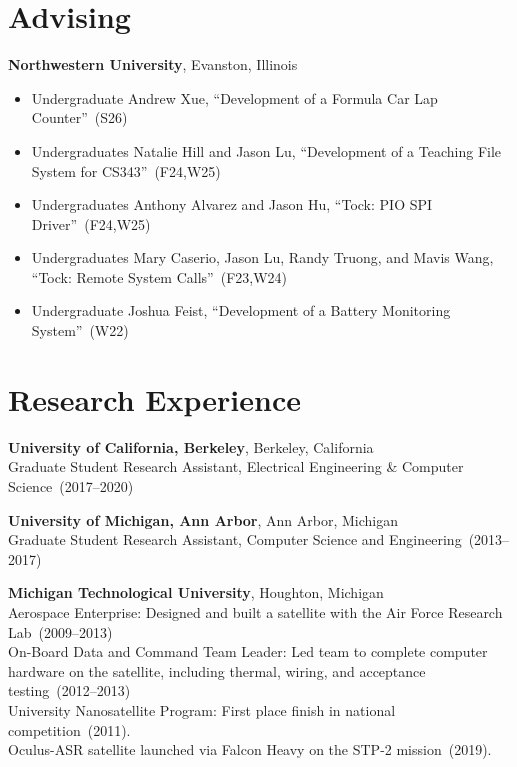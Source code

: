 \documentclass{article}
\begin{document}
\section*{Advising}
\vspace{-6pt}
{\bf Northwestern University}, Evanston, Illinois
\vspace{-6pt}
\begin{itemize}
  \item[] Undergraduate Andrew Xue, ``Development of a Formula Car Lap Counter''~(S26)
  \item[] Undergraduates Natalie Hill and Jason Lu, ``Development of a Teaching File System for CS343''~(F24,W25)
  \item[] Undergraduates Anthony Alvarez and Jason Hu, ``Tock: PIO SPI Driver''~(F24,W25)
  \item[] Undergraduates Mary Caserio, Jason Lu, Randy Truong, and Mavis Wang, ``Tock: Remote System Calls''~(F23,W24)
  \item[] Undergraduate Joshua Feist, ``Development of a Battery Monitoring System''~(W22)
\end{itemize}


\section*{Research Experience}
\vspace{-6pt}

{\bf University of California, Berkeley}, Berkeley, California \\
Graduate Student Research Assistant, Electrical Engineering \& Computer Science~(2017--2020)

{\bf University of Michigan, Ann Arbor}, Ann Arbor, Michigan \\
Graduate Student Research Assistant, Computer Science and Engineering~(2013--2017)

{\bf Michigan Technological University}, Houghton, Michigan \\
Aerospace Enterprise: Designed and built a satellite with the Air Force Research Lab~(2009--2013) \\
On-Board Data and Command Team Leader: Led team to complete computer hardware
on the satellite, including thermal, wiring, and acceptance testing~(2012--2013) \\
University Nanosatellite Program: First place finish in national competition~(2011). \\
Oculus-ASR satellite launched via Falcon Heavy on the STP-2 mission~(2019).
\end{document}
